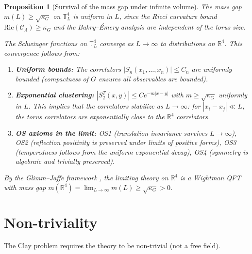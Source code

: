 \documentclass[11pt]{article}
\newtheorem{proposition}[theorem]{Proposition}
\theoremstyle{definition}
\newcommand{\calC}{\mathcal{C}}
\newcommand{\Ric}{\mathrm{Ric}}
\newcommand{\R}{\mathbb{R}}
\newcommand{\T}{\mathbb{T}}
\begin{document}
\begin{proposition}[Survival of the mass gap under infinite volume]\label{prop:thermo}
The mass gap $m(L) \geq \sqrt{\kappa_G}$ on $\T^4_L$ is uniform in $L$, since the Ricci curvature bound $\Ric(\calC_\Lambda) \geq \kappa_G$ and the Bakry--\'Emery analysis are independent of the torus size.

The Schwinger functions on $\T^4_L$ converge as $L \to \infty$ to distributions on $\R^4$. This convergence follows from:
\begin{enumerate}
    \item \textbf{Uniform bounds:} The correlators $|S_n(x_1, \ldots, x_n)| \leq C_n$ are uniformly bounded (compactness of $G$ ensures all observables are bounded).

    \item \textbf{Exponential clustering:} $|S_2^T(x,y)| \leq Ce^{-m|x-y|}$ with $m \geq \sqrt{\kappa_G}$ uniformly in $L$. This implies that the correlators stabilize as $L \to \infty$: for $|x_i - x_j| \ll L$, the torus correlators are exponentially close to the $\R^4$ correlators.

    \item \textbf{OS axioms in the limit:} OS1 (translation invariance survives $L \to \infty$), OS2 (reflection positivity is preserved under limits of positive forms), OS3 (temperedness follows from the uniform exponential decay), OS4 (symmetry is algebraic and trivially preserved).
\end{enumerate}

By the Glimm--Jaffe framework \cite{GlimmJaffe}, the limiting theory on $\R^4$ is a Wightman QFT with mass gap $m(\R^4) = \lim_{L \to \infty} m(L) \geq \sqrt{\kappa_G} > 0$.
\end{proposition}


\section{Non-triviality}
\label{sec:nontrivial}

The Clay problem requires the theory to be non-trivial (not a free field).
\end{document}
